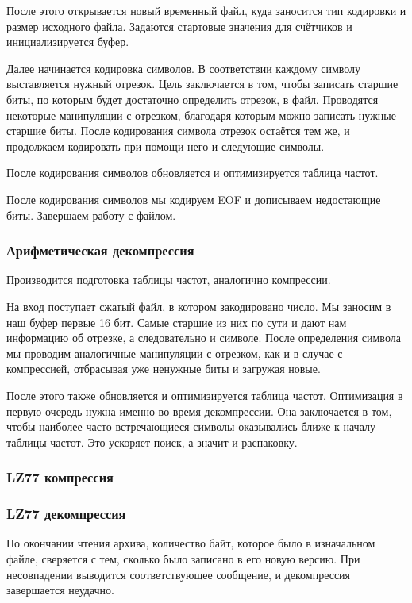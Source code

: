 \documentclass[12pt]{article}
\begin{document}
После этого открывается новый временный файл, куда заносится тип кодировки и размер исходного файла. Задаются стартовые значения для счётчиков и инициализируется буфер. 

Далее начинается кодировка символов. В соответствии каждому символу выставляется нужный отрезок. Цель заключается в том, чтобы записать старшие биты, по которым будет достаточно определить отрезок, в файл. Проводятся некоторые манипуляции с отрезком, благодаря которым можно записать нужные старшие биты. После кодирования символа отрезок остаётся тем же, и продолжаем кодировать при помощи него и следующие символы.

После кодирования символов обновляется и оптимизируется таблица частот.

После кодирования символов мы кодируем EOF и дописываем недостающие биты. Завершаем работу с файлом.

\subsubsection*{Арифметическая декомпрессия}

Производится подготовка таблицы частот, аналогично компрессии.

На вход поступает сжатый файл, в котором закодировано число. Мы заносим в наш буфер первые 16 бит. Самые старшие из них по сути и дают нам информацию об отрезке, а следовательно и символе. После определения символа мы проводим аналогичные манипуляции с отрезком, как и в случае с компрессией, отбрасывая уже ненужные биты и загружая новые.

После этого также обновляется и оптимизируется таблица частот. Оптимизация в первую очередь нужна именно во время декомпрессии. Она заключается в том, чтобы наиболее часто встречающиеся символы оказывались ближе к началу таблицы частот. Это ускоряет поиск, а значит и распаковку.

\subsubsection*{LZ77 компрессия}%

\subsubsection*{LZ77 декомпрессия}%

По окончании чтения архива, количество байт, которое было в изначальном файле, сверяется с тем, сколько было записано в его новую версию. При несовпадении выводится соответствующее сообщение, и декомпрессия завершается неудачно.
\end{document}

